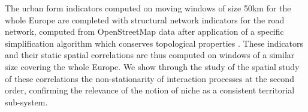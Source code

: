 \documentclass[11pt]{article}
\begin{document}
The urban form indicators computed on moving windows of size 50km for the whole Europe are completed with structural network indicators for the road network, computed from OpenStreetMap data after application of a specific simplification algorithm which conserves topological properties \citep{raimbault2018urban}. These indicators and their static spatial correlations are thus computed on windows of a similar size covering the whole Europe. We show through the study of the spatial study of these correlations the non-stationarity of interaction processes at the second order, confirming the relevance of the notion of niche as a consistent territorial sub-system.
\end{document}
